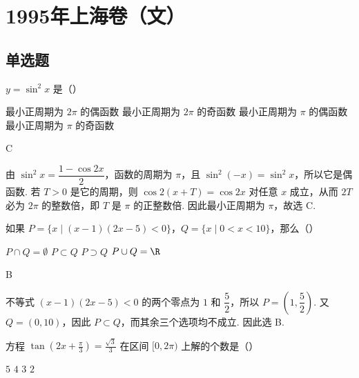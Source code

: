 \documentclass[UTF8,a4paper,oneside,11pt]{ctexbook}
\begin{document}
\mainmatter

\chapter{1995年上海卷（文）}
\section{单选题}

\begin{problem}
\(y=\sin^2 x\) 是（\quad）

\choices
    {最小正周期为 \(2\pi \) 的偶函数}
    {最小正周期为 \(2 \pi\) 的奇函数}
    {最小正周期为 \(\pi \) 的偶函数}
    {最小正周期为 \(\pi\) 的奇函数}
\end{problem}

\begin{answer}
C
\end{answer}

\begin{solution}
由 \(\sin^2x=\dfrac{1-\cos2x}{2}\)，函数的周期为 \(\pi\)，且 \(\sin^2(-x)=\sin^2x\)，所以它是偶函数. 若 \(T>0\) 是它的周期，则 \(\cos2(x+T)=\cos2x\) 对任意 \(x\) 成立，从而 \(2T\) 必为 \(2\pi\) 的整数倍，即 \(T\) 是 \(\pi\) 的正整数倍. 因此最小正周期为 \(\pi\)，故选 C.
\end{solution}

\begin{problem}
如果 \(P = \{x \mid (x - 1)(2x - 5) < 0\}\)，\(Q = \{x \mid 0 < x < 10\}\)，那么（\quad）

\choices
    {\(P\cap Q=\emptyset\)}
    {\(P \subset Q\)}
    {\(P\supset Q\)}
    {\(P\cup Q=\R\)}
\end{problem}

\begin{answer}
B
\end{answer}

\begin{solution}
不等式 \((x-1)(2x-5)<0\) 的两个零点为 \(1\) 和 \(\dfrac{5}{2}\)，所以 \(P=\left(1,\dfrac{5}{2}\right)\). 又 \(Q=(0,10)\)，因此 \(P\subset Q\)，而其余三个选项均不成立. 因此选 B.
\end{solution}

\begin{problem}
方程 \(\tan\left(2x+\frac{\pi}{3}\right)=\frac{\sqrt{3}}{3}\) 在区间 \([0,2\pi)\) 上解的个数是（\quad）

\choices
    {\(5\)}
    {\(4\)}
    {\(3\)}
    {\(2\)}
\end{problem}
\end{document}
